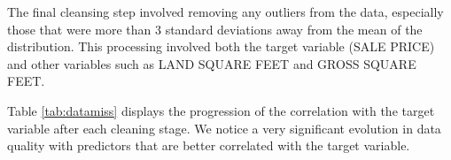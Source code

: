 \documentclass[
]{article}
\begin{document}
\begin{table}[H]
\centering
\caption{\label{tab:datamiss}Percentage of missing values by variable.}
\centering
{}
\end{table}

The final cleansing step involved removing any outliers from the data, especially those that were more than 3 standard deviations away from the mean of the distribution. This processing involved both the target variable (SALE PRICE) and other variables such as LAND SQUARE FEET and GROSS SQUARE FEET.

Table \ref{tab:datamiss} displays the progression of the correlation with the target variable after each cleaning stage. We notice a very significant evolution in data quality with predictors that are better correlated with the target variable.
\end{document}

